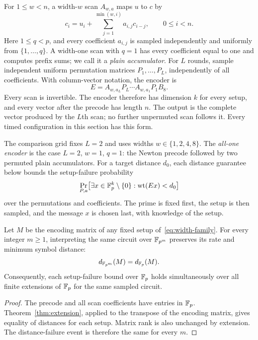 For $1\le w<n$, a width-$w$ scan $A_{w,a}$ maps $u$ to $c$ by
\begin{equation}\label{eq:width-scan}
 c_i=u_i+\sum_{j=1}^{\min(w,i)}a_{i,j}c_{i-j},
 \qquad 0\le i<n.
\end{equation}
Here $1\le q<p$, and every coefficient $a_{i,j}$ is sampled independently
and uniformly from $\{1,\ldots,q\}$. A width-one scan with $q=1$ has
every coefficient equal to one and computes prefix sums; we call it a
\emph{plain accumulator}. For $L$ rounds, sample independent uniform
permutation matrices $P_1,\ldots,P_L$, independently of all coefficients.
With column-vector notation, the encoder is
\begin{equation}\label{eq:width-family}
 E=A_{w,a_L}P_L\cdots A_{w,a_1}P_1 B_8.
\end{equation}
Every scan is invertible. The encoder therefore has dimension $k$ for
every setup, and every vector after the precode has length $n$.
The output is the complete vector produced by the $L$th scan; no
further unpermuted scan follows it. Every timed configuration in this
section has this form.

The comparison grid fixes $L=2$ and uses widths $w\in\{1,2,4,8\}$.
The \emph{all-one encoder} is the case $L=2$, $w=1$, $q=1$: the Newton
precode followed by two permuted plain accumulators. For a target
distance $d_0$, each distance guarantee below bounds the setup-failure
probability
\[
 \Pr_{P,a}\bigl[\exists x\in\mathbb F_p^k\setminus\{0\}:
                         \operatorname{wt}(E x)<d_0\bigr]
\]
over the permutations and coefficients. The prime is fixed first, the
setup is then sampled, and the message $x$ is chosen last, with knowledge
of the setup.

\begin{corollary}\label{cor:encoder-extension}
Let $M$ be the encoding matrix of any fixed setup
of~\eqref{eq:width-family}. For every integer $m\ge1$, interpreting the same
circuit over $\mathbb F_{p^m}$ preserves its rate and minimum symbol distance:
\[
 d_{\mathbb F_{p^m}}(M)=d_{\mathbb F_p}(M).
\]
Consequently, each setup-failure bound over $\mathbb F_p$ holds simultaneously
over all finite extensions of $\mathbb F_p$ for the same sampled circuit.
\end{corollary}
\begin{proof}
The precode and all scan coefficients have entries in $\mathbb F_p$.
Theorem~\ref{thm:extension}, applied to the transpose of the encoding
matrix, gives equality of distances for each setup. Matrix rank is also
unchanged by extension. The distance-failure event is therefore the same
for every $m$.
\end{proof}

